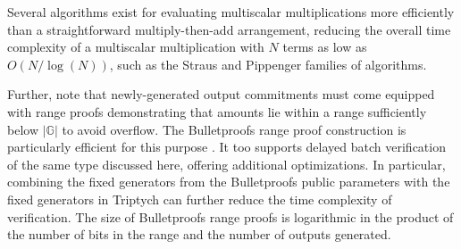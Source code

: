\documentclass[draft]{article}
\newcommand{\G}{\mathbb{G}}
\begin{document}
Several algorithms exist for evaluating multiscalar multiplications more efficiently than a straightforward multiply-then-add arrangement, reducing the overall time complexity of a multiscalar multiplication with $N$ terms as low as $O(N/\log(N))$, such as the Straus \cite{straus} and Pippenger \cite{pippenger} families of algorithms.

Further, note that newly-generated output commitments must come equipped with range proofs demonstrating that amounts lie within a range sufficiently below $|\G|$ to avoid overflow.
The Bulletproofs range proof construction is particularly efficient for this purpose \cite{bulletproofs}.
It too supports delayed batch verification of the same type discussed here, offering additional optimizations.
In particular, combining the fixed generators from the Bulletproofs public parameters with the fixed generators in Triptych can further reduce the time complexity of verification.
The size of Bulletproofs range proofs is logarithmic in the product of the number of bits in the range and the number of outputs generated.




\end{document}
